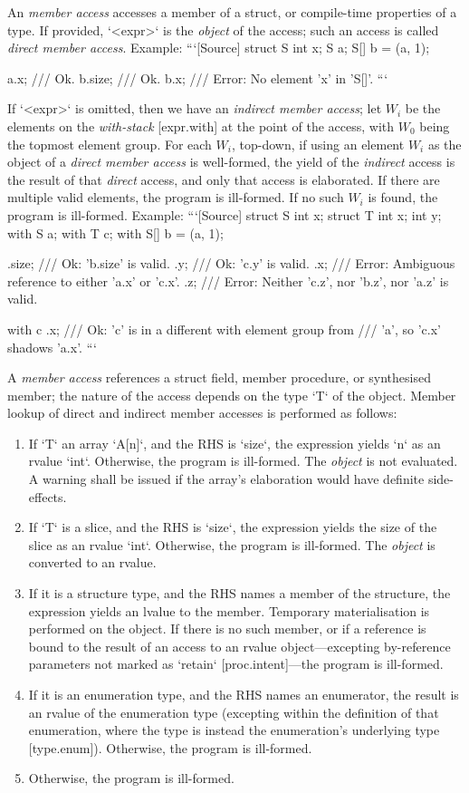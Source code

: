 \documentclass[a4paper, 12pt, oneside, final]{article}
\def\sref[#1]{[#1]}
\begin{document}
An \emph{member access} accesses a member of a struct, or compile-time properties of
a type. If provided, `<expr>` is the \emph{object} of the access; such an access is
called \emph{direct member access}. Example:
```[Source]
struct S { int x; }
S a;
S[] b = (a, 1);

a.x;    /// Ok.
b.size; /// Ok.
b.x;    /// Error: No element 'x' in 'S[]'.
```

If `<expr>` is omitted, then we have an \emph{indirect member access}; let $W_i$ be
the elements on the \emph{with-stack} [expr.with]
at the point of the access, with $W_0$ being the topmost element group. For each $W_i$, top-down,
if using an element $W_i$ as the object of a \emph{direct member access} is well-formed, the yield of
the \emph{indirect} access is the result of that \emph{direct} access, and only that access is
elaborated. If there are multiple valid elements, the program is ill-formed. If no such $W_i$ is found,
the program is ill-formed. Example:
\MDAllowBreak
```[Source]
struct S { int x; }
struct T { int x; int y; }
with S a;
with T c;
with S[] b = (a, 1);

.size; /// Ok: 'b.size' is valid.
.y;    /// Ok: 'c.y' is valid.
.x;    /// Error: Ambiguous reference to either 'a.x' or 'c.x'.
.z;    /// Error: Neither 'c.z', nor 'b.z', nor 'a.z' is valid.

with c {
    .x; /// Ok: 'c' is in a different with element group from
        /// 'a', so 'c.x' shadows 'a.x'.
}
```

A \emph{member access} references a struct field, member procedure, or synthesised
member; the nature of the access depends on the type `T` of the object. Member lookup of
direct and indirect member accesses is performed as follows:
\begin{enumerate}
\item If `T` an array `A[n]`, and the RHS is `size`, the expression yields `n`
      as an rvalue `int`. Otherwise, the program is ill-formed. The \emph{object}
      is not evaluated. A warning shall be issued if the array’s elaboration would
      have definite side-effects.
\item If `T` is a slice, and the RHS is `size`, the expression yields
      the size of the slice as an rvalue `int`. Otherwise, the program is ill-formed.
      The \emph{object} is converted to an rvalue.
\item If it is a structure type, and the RHS names a member of the structure, the
      expression yields an lvalue to the member. Temporary materialisation is performed
      on the object. If there is no such member, or if a reference is bound to the result
      of an access to an rvalue object—excepting by-reference parameters not marked as `retain`
      \sref[proc.intent]—the program is ill-formed.
\item If it is an enumeration type, and the RHS names an enumerator, the result is
      an rvalue of the enumeration type (excepting within the definition of that enumeration,
      where the type is instead the enumeration’s underlying type [type.enum]). Otherwise,
      the program is ill-formed.
\item Otherwise, the program is ill-formed.
\end{enumerate}
\end{document}
